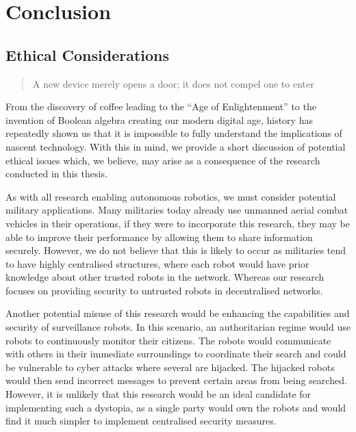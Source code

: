 \chapter{Conclusion}

\section{Ethical Considerations}

\begin{quote}
    \centering 
    A new device merely opens a door; it does not compel one to enter\\
\end{quote}

From the discovery of coffee leading to the ``Age of Enlightenment'' to the invention of Boolean algebra creating our modern digital age, history has repeatedly shown us that it is impossible to fully understand the implications of nascent technology. With this in mind, we provide a short discussion of potential ethical issues which, we believe, may arise as a consequence of the research conducted in this thesis.

As with all research enabling autonomous robotics, we must consider potential military applications. Many militaries today already use unmanned aerial combat vehicles in their operations, if they were to incorporate this research, they may be able to improve their performance by allowing them to share information securely. However, we do not believe that this is likely to occur as militaries tend to have highly centralised structures, where each robot would have prior knowledge about other trusted robots in the network. Whereas our research focuses on providing security to untrusted robots in decentralised networks.

Another potential misuse of this research would be enhancing the capabilities and security of surveillance robots. In this scenario, an authoritarian regime would use robots to continuously monitor their citizens. The robots would communicate with others in their immediate surroundings to coordinate their search and could be vulnerable to cyber attacks where several are hijacked. The hijacked robots would then send incorrect messages to prevent certain areas from being searched. However, it is unlikely that this research would be an ideal candidate for implementing such a dystopia, as a single party would own the robots and would find it much simpler to implement centralised security measures.

